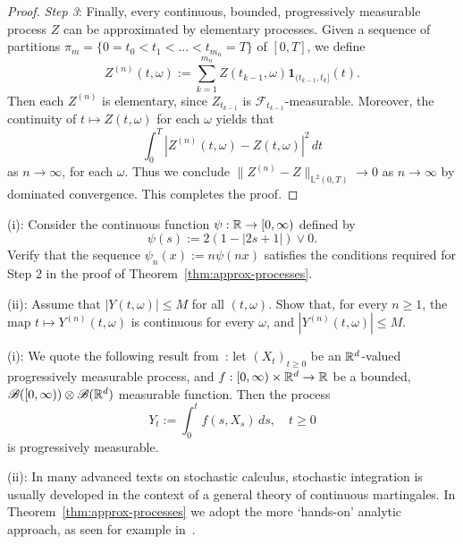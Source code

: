 \begin{proof}
    \emph{Step 3}: Finally, every continuous, bounded, progressively measurable process $Z$ can be approximated by elementary processes. Given a sequence of partitions $\pi_m=\{0=t_0<t_1<\ldots< t_{m_n}=T\}$ of $[0,T]$, we define
    \begin{equation*}
        Z^{(n)}(t,\omega):= \sum_{k=1}^{m_n} Z(t_{k-1},\omega)\mathbf{1}_{(t_{k-1},t_k]}(t).
    \end{equation*}
    Then each $Z^{(n)}$ is elementary, since $Z_{t_{k-1}}$ is $\mathcal{F}_{t_{k-1}}$-measurable. Moreover, the continuity of $t\mapsto Z(t,\omega)$ for each $\omega$ yields that
    \begin{equation*}
        \int_0^T |Z^{(n)}(t,\omega)-Z(t,\omega)|^2\,dt
    \end{equation*}
    as $n\to\infty$, for each $\omega$. Thus we conclude $\|Z^{(n)}-Z\|_{\mathbb{L}^2(0,T)}\to 0$ as $n\to\infty$ by dominated convergence. This completes the proof.
\end{proof}

\begin{exercise}
\label{exer:step2}
    (i): Consider the continuous function $\psi:\mathbb{R}\to [0,\infty)$ defined by
    \begin{equation*}
        \psi(s) := 2(1-|2s+1|)\vee 0.
    \end{equation*}
    Verify that the sequence $\psi_n(x):=n\psi(nx)$ satisfies the conditions required for Step 2 in the proof of Theorem~\ref{thm:approx-processes}.

    (ii): Assume that $|Y(t,\omega)|\le M$ for all $(t,\omega)$. Show that, for every $n\ge 1$, the map $t\mapsto Y^{(n)}(t,\omega)$ is continuous for every $\omega$, and $|Y^{(n)}(t,\omega)|\le M$.
\end{exercise}

\begin{remark}
\label{rmk:prog-meas-2}
    (i): We quote the following result from~\cite[Problem 1.2.19]{KS}: let $(X_t)_{t\ge 0}$ be an $\mathbb{R}^d$-valued progressively measurable process, and $f:[0,\infty)\times\mathbb{R}^d\to\mathbb{R}$ be a bounded, $\mathscr{B}([0,\infty))\otimes\mathscr{B}(\mathbb{R}^d)$ measurable function. Then the process
    \begin{equation*}
        Y_t := \int_0^t f(s,X_s)\,ds, \quad t\ge 0
    \end{equation*}
    is progressively measurable.

    (ii): In many advanced texts on stochastic calculus, stochastic integration is usually developed in the context of a general theory of continuous martingales. In Theorem~\ref{thm:approx-processes} we adopt the more `hands-on' analytic approach, as seen for example in~\cite[Section 3.1]{Ok03}.
\end{remark}


